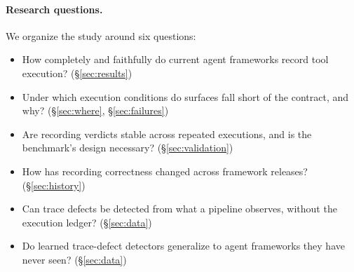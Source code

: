 \documentclass[10pt]{article}
\begin{document}
\paragraph{Research questions.} We organize the study around six questions:
\begin{itemize}
\item[\textbf{RQ1}] How completely and faithfully do current agent frameworks record tool execution? (\S\ref{sec:results})
\item[\textbf{RQ2}] Under which execution conditions do surfaces fall short of the contract, and why? (\S\ref{sec:where}, \S\ref{sec:failures})
\item[\textbf{RQ3}] Are recording verdicts stable across repeated executions, and is the benchmark's design necessary? (\S\ref{sec:validation})
\item[\textbf{RQ4}] How has recording correctness changed across framework releases? (\S\ref{sec:history})
\item[\textbf{RQ5}] Can trace defects be detected from what a pipeline observes, without the execution ledger? (\S\ref{sec:data})
\item[\textbf{RQ6}] Do learned trace-defect detectors generalize to agent frameworks they have never seen? (\S\ref{sec:data})
\end{itemize}
\end{document}
